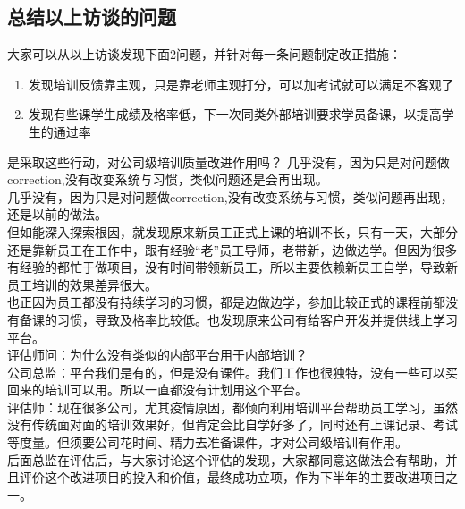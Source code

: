 \hypertarget{ux603bux7ed3ux8bbfux8c08ux7684ux95eeux9898ux53d1ux73b0}{%
\subsection{总结以上访谈的问题}\label{ux603bux7ed3ux8bbfux8c08ux7684ux95eeux9898ux53d1ux73b0}}

大家可以从以上访谈发现下面2问题，并针对每一条问题制定改正措施：

\begin{enumerate}
\tightlist
\item
  发现培训反馈靠主观，只是靠老师主观打分，可以加考试就可以满足不客观了
\item
  发现有些课学生成绩及格率低，下一次同类外部培训要求学员备课，以提高学生的通过率
\end{enumerate}

是采取这些行动，对公司级培训质量改进作用吗？ 几乎没有，因为只是对问题做correction,没有改变系统与习惯，类似问题还是会再出现。\\
几乎没有，因为只是对问题做correction,没有改变系统与习惯，类似问题再出现，还是以前的做法。\\
但如能深入探索根因，就发现原来新员工正式上课的培训不长，只有一天，大部分还是靠新员工在工作中，跟有经验``老''员工导师，老带新，边做边学。但因为很多有经验的都忙于做项目，没有时间带领新员工，所以主要依赖新员工自学，导致新员工培训的效果差异很大。\\
也正因为员工都没有持续学习的习惯，都是边做边学，参加比较正式的课程前都没有备课的习惯，导致及格率比较低。也发现原来公司有给客户开发并提供线上学习平台。\\
评估师问：为什么没有类似的内部平台用于内部培训？\\
公司总监：平台我们是有的，但是没有课件。我们工作也很独特，没有一些可以买回来的培训可以用。所以一直都没有计划用这个平台。\\
评估师：现在很多公司，尤其疫情原因，都倾向利用培训平台帮助员工学习，虽然没有传统面对面的培训效果好，但肯定会比自学好多了，同时还有上课记录、考试等度量。但须要公司花时间、精力去准备课件，才对公司级培训有作用。\\
后面总监在评估后，与大家讨论这个评估的发现，大家都同意这做法会有帮助，并且评价这个改进项目的投入和价值，最终成功立项，作为下半年的主要改进项目之一。\\


